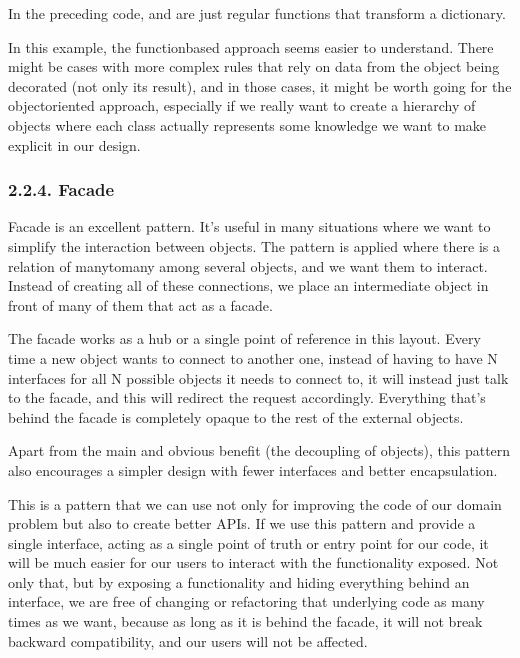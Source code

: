 \documentclass[a4paper,10pt,english]{sphinxmanual}
\begin{document}
In the preceding code,  and  are just regular functions
that transform a dictionary.

In this example, the function\sphinxhyphen{}based approach seems easier to understand. There might be
cases with more complex rules that rely on data from the object being decorated (not only
its result), and in those cases, it might be worth going for the object\sphinxhyphen{}oriented approach,
especially if we really want to create a hierarchy of objects where each class actually
represents some knowledge we want to make explicit in our design.


\subsubsection{2.2.4. Facade}
\label{\detokenize{chapters/9_design_patterns/index:facade}}
Facade is an excellent pattern. It’s useful in many situations where we want to simplify the
interaction between objects. The pattern is applied where there is a relation of many\sphinxhyphen{}to\sphinxhyphen{}many
among several objects, and we want them to interact. Instead of creating all of these
connections, we place an intermediate object in front of many of them that act as a facade.

The facade works as a hub or a single point of reference in this layout. Every time a new
object wants to connect to another one, instead of having to have N interfaces for all N
possible objects it needs to connect to, it will instead just talk to the facade, and this will
redirect the request accordingly. Everything that’s behind the facade is completely opaque
to the rest of the external objects.

Apart from the main and obvious benefit (the decoupling of objects), this pattern also
encourages a simpler design with fewer interfaces and better encapsulation.

This is a pattern that we can use not only for improving the code of our domain problem
but also to create better APIs. If we use this pattern and provide a single interface, acting as
a single point of truth or entry point for our code, it will be much easier for our users to
interact with the functionality exposed. Not only that, but by exposing a functionality and
hiding everything behind an interface, we are free of changing or refactoring that
underlying code as many times as we want, because as long as it is behind the facade, it
will not break backward compatibility, and our users will not be affected.
\end{document}
